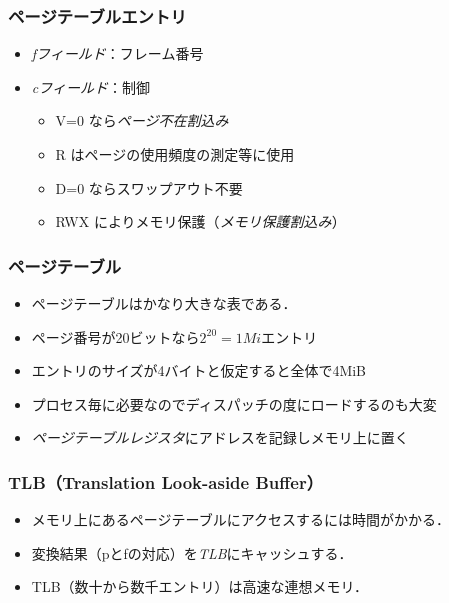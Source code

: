 \documentclass[unicode,handout]{beamer}                   %
\begin{document}
\begin{frame}
  \frametitle{ページテーブルエントリ}
  \begin{itemize}
  \item \emph{fフィールド}：フレーム番号
  \item \emph{cフィールド}：制御 \\
    \begin{itemize}
    \item V=0 なら\emph{ページ不在割込み}
    \item R はページの使用頻度の測定等に使用
    \item D=0 ならスワップアウト不要
    \item RWX によりメモリ保護（\emph{メモリ保護割込み}）
    \end{itemize}
  \end{itemize}
\end{frame}

\begin{frame}
  \frametitle{ページテーブル}
  \begin{itemize}
  \item ページテーブルはかなり大きな表である．
  \item ページ番号が20ビットなら$2^{20}=1Mi$エントリ
  \item エントリのサイズが4バイトと仮定すると全体で4MiB
  \item プロセス毎に必要なのでディスパッチの度にロードするのも大変
  \item \emph{ページテーブルレジスタ}にアドレスを記録しメモリ上に置く
  \end{itemize}
\end{frame}

\begin{frame}
  \frametitle{TLB（Translation Look-aside Buffer）}
  \begin{itemize}
  \item メモリ上にあるページテーブルにアクセスするには時間がかかる．
  \item 変換結果（pとfの対応）を\emph{TLB}にキャッシュする．
  \item TLB（数十から数千エントリ）は高速な連想メモリ．
  \end{itemize}
\end{frame}
\end{document}
